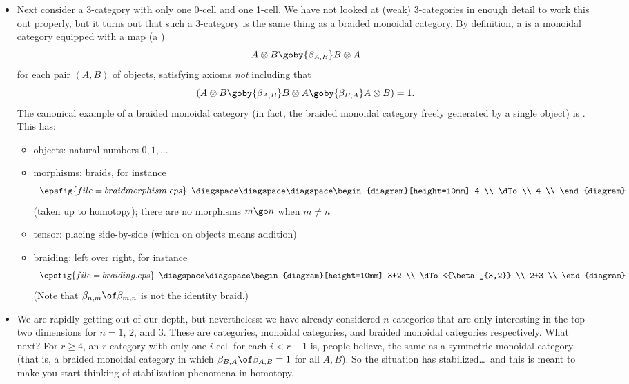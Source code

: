 \begin{itemize}
\item Next consider a 3-category%
%
%
with only one 0-cell and one 1-cell.  We
have not looked at (weak) 3-categories in enough detail to work this out
properly, but it turns out that such a 3-category is the same thing as a
braided monoidal category.  By definition, a  is a monoidal category equipped with a map (a )
\[
A\otimes B \goby{\beta_{A,B}} B\otimes A
\]
for each pair $(A,B)$ of objects, satisfying axioms \emph{not} including
that
\[
(A\otimes B \goby{\beta_{A,B}} B\otimes A \goby{\beta_{B,A}} A\otimes B)
= 1.
\]
The canonical example of a braided monoidal category (in fact, the braided
monoidal category freely generated by a single object) is .%
% 
%
 This
has:
%
\begin{itemize}
\item objects: natural numbers $0, 1, \ldots$
\item morphisms: braids,%
%
%
for instance
\[
\begin{array}[c]{c}
\epsfig{file=braidmorphism.eps}
\end{array}
\diagspace\diagspace\diagspace
\begin{diagram}[height=10mm]
4 \\ \dTo \\ 4 \\
\end{diagram}
\]
(taken up to homotopy); there are no morphisms $m \go n$ when $m \neq n$
\item tensor: placing side-by-side (which on objects means addition)
\item braiding: left over right, for instance
\[
\begin{array}[c]{c}
\epsfig{file=braiding.eps}
\end{array}
\diagspace\diagspace
\begin{diagram}[height=10mm]
3+2 \\ \dTo<{\beta_{3,2}} \\ 2+3 \\
\end{diagram}
\]
(Note that $\beta_{n,m} \of \beta_{m,n}$ is not the identity braid.)
\end{itemize}

\item We are rapidly getting out of our depth, but nevertheless: we have
already considered $n$-categories that are only interesting in the top two
dimensions for $n= 1$, $2$, and $3$.  These are categories, monoidal
categories, and braided monoidal categories respectively.  What next?  For
$r\geq 4$, an $r$-category with only one $i$-cell for each $i<r-1$ is,
people believe, the same as a symmetric%
%
%
monoidal category (that is, a
braided monoidal category in which $\beta_{B,A} \of \beta_{A,B} = 1$ for
all $A,B$).  So the situation has stabilized\ldots\ and this is meant to
make you start thinking of stabilization phenomena in homotopy.
\end{itemize}

